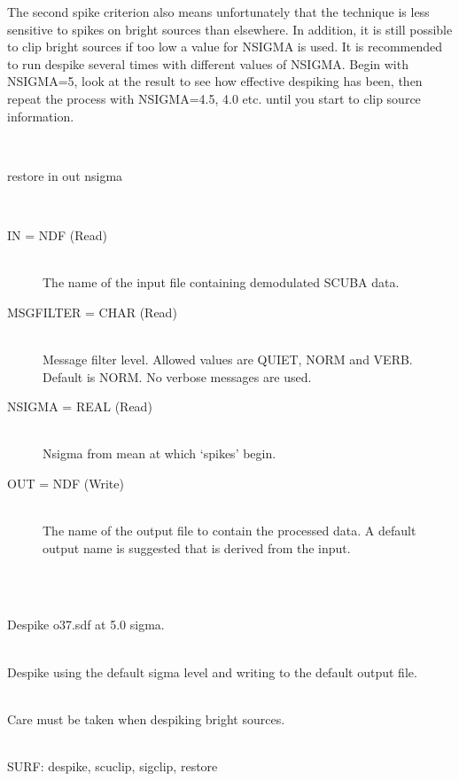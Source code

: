 \documentclass[twoside,11pt]{article}
\newcommand{\task}[1]{{\sf #1}}
\newcommand{\sigclip}{\htmlref{\task{sigclip}}{SIGCLIP}}
\newcommand{\restore}{\htmlref{\task{restore}}{RESTORE}}
\newcommand{\despike}{\htmlref{\task{despike}}{DESPIKE}}
\newcommand{\scuclip}{\htmlref{\task{scuclip}}{SCUCLIP}}
\newcommand{\htmlref}[2]{#1}
\renewcommand{\_}{\texttt{\symbol{95}}}
\newlength{\sstexampleslength}
\newcommand{\sstusage}[1]{\item[Usage:] \mbox{}
\\[1.3ex]{\raggedright \ssttt #1}}
\newcommand{\sstparameters}[1]{
   \item[Parameters:] \mbox{} \\
   \vspace{-3.5ex}
   \begin{description}
      #1
   \end{description}
}
\newcommand{\sstexamples}[1]{
   \item[Examples:] \mbox{} \\
   \vspace{-3.5ex}
   \begin{description}
      #1
   \end{description}
}
\newcommand{\sstsubsection}[1]{ \item[{#1}] \mbox{} \\}
\newcommand{\sstexamplesubsection}[2]{\sloppy
\item[\parbox{\sstexampleslength}{\ssttt #1}] \mbox{} \vspace{1.0ex}
\\ #2 }
\newcommand{\sstnotes}[1]{\item[Notes:] \mbox{} \\[1.3ex] #1}
\newcommand{\sstdiytopic}[2]{\item[{\hspace{-0.35em}#1\hspace{-0.35em}:}]
\mbox{} \\[1.3ex] #2}
\newcommand{\sstusage}[1]{\item[Usage:]
      \begin{description}
         {\ssttt #1}
      \end{description}
      \\
   }
\newcommand{\sstparameters}[1]{
      \item[Parameters:] \\
      \begin{description}
         #1
      \end{description}
      \\
   }
\newcommand{\sstexamples}[1]{
      \item[Examples:] \\
      \begin{description}
         #1
      \end{description}
      \\
   }
\newcommand{\sstsubsection}[1]{\item[{#1}]}
\newcommand{\sstexamplesubsection}[2]{\item[{\ssttt #1}] #2}
\newcommand{\sstnotes}[1]{\item[Notes:] #1 }
\newcommand{\sstdiytopic}[2]{\item[{#1}] #2 }
\begin{document}
{{      The second spike criterion also means unfortunately that the
      technique is less sensitive to spikes on bright sources than
      elsewhere. In addition, it is still possible to clip bright
      sources if too low a value for NSIGMA is used. It is
      recommended to run despike several times with different values
      of NSIGMA. Begin with NSIGMA=5, look at the result to see how
      effective despiking has been, then repeat the process with
      NSIGMA=4.5, 4.0 etc. until you start to clip source
      information.
   }
   \sstusage{
      restore in out nsigma
   }
   \sstparameters{
      \sstsubsection{
         IN = NDF (Read)
      }{
         The name of the input file containing demodulated SCUBA data.
      }
      \sstsubsection{
         MSG\_FILTER = CHAR (Read)
      }{
         Message filter level. Allowed values are QUIET, NORM and VERB.
         Default is NORM. No verbose messages are used.
      }
      \sstsubsection{
         NSIGMA = REAL (Read)
      }{
         Nsigma from mean at which `spikes' begin.
      }
      \sstsubsection{
         OUT = NDF (Write)
      }{
         The name of the output file to contain the processed data.
         A default output name is suggested that is derived from the
         input.
      }
   }
   \sstexamples{
      \sstexamplesubsection{
         restore o37 o37\_des 5.0
      }{
         Despike o37.sdf at 5.0 sigma.
      }
      \sstexamplesubsection{
         restore o37 $\backslash$
      }{
         Despike using the default sigma level and writing to the
         default output file.
      }
   }
   \sstnotes{
      Care must be taken when despiking bright sources.
   }
   \sstdiytopic{
      Related Applications
   }{
      SURF: \despike, \scuclip, \sigclip, \restore
   }

}
\end{document}
